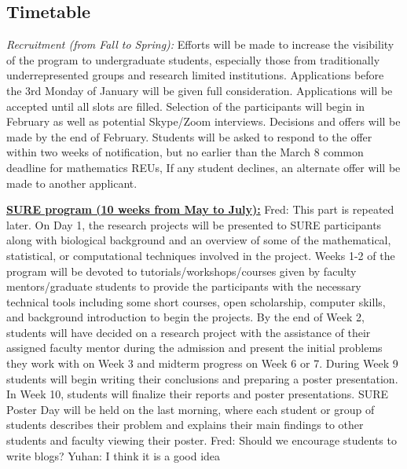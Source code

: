 \documentclass[11pt]{NSFamsart}
\newcommand{\FJHNote}[1]{{\color{blue}Fred: #1}}
\newcommand{\YDNote}[1]{{\color{magenta}Yuhan: #1}}
\begin{document}
\subsection{Timetable}
\emph{Recruitment (from Fall to Spring):} Efforts will be made to increase the visibility of the program to undergraduate students, especially those from traditionally underrepresented groups and research limited institutions. Applications before the 3rd Monday of January will be given full consideration. Applications will be accepted until all slots are filled. Selection of the participants will begin in February as well as potential Skype/Zoom interviews. Decisions and offers will be made by the end of February. Students will be asked to respond to the offer within two weeks of notification, but no earlier than the March 8 common deadline for mathematics REUs, If any student declines, an alternate offer will be made to another applicant. 
 
\noindent\textbf{\underline{SURE program (10 weeks from
May to July):}} \FJHNote{This part is repeated later.}
On Day 1, the research projects will be presented to SURE participants along with biological background and an overview of some of the mathematical, statistical, or computational techniques involved in the project. 
Weeks 1-2 of the program will be devoted to tutorials/workshops/courses given by faculty mentors/graduate students to provide the participants with the necessary technical tools including some short courses, open scholarship,  computer skills, and background introduction to begin the projects. By the end of Week 2, students will have decided on a research project with the assistance of their assigned faculty mentor during the admission and present the initial problems they work with on Week 3 and midterm progress on Week 6 or 7. During Week 9 students will begin writing their conclusions and preparing a poster presentation. In Week 10, students will finalize their reports and poster presentations. SURE Poster Day will be held on the last morning, where each student or group of students describes their problem and explains their main findings to other students and faculty viewing their poster.  \FJHNote{Should we encourage students to write blogs? \cite{Hig21a} 
}
\YDNote{I think it is a good idea}
\end{document}
